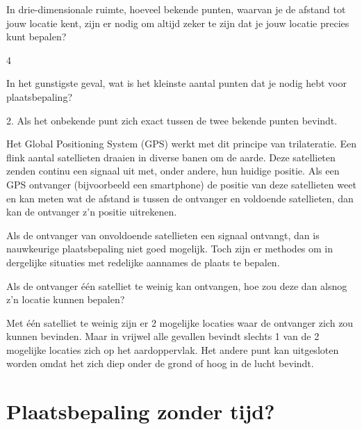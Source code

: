 \begin{opgave}
	\begin{subopgave}
		In drie-dimensionale ruimte, hoeveel bekende punten, waarvan je de afstand tot jouw locatie kent, zijn er nodig om altijd zeker te zijn dat je jouw locatie precies kunt bepalen? 
		\begin{antwoord}
			4
		\end{antwoord}
	\end{subopgave}
	\begin{subopgave}		
		In het gunstigste geval, wat is het kleinste aantal punten dat je nodig hebt voor plaatsbepaling?
		\begin{antwoord}
			2. Als het onbekende punt zich exact tussen de twee bekende punten bevindt.
		\end{antwoord}				
	\end{subopgave}
\end{opgave}

Het Global Positioning System (GPS) werkt met dit principe van trilateratie. Een flink aantal satellieten draaien in diverse banen om de aarde. Deze satellieten zenden continu een signaal uit met, onder andere, hun huidige positie. Als een GPS ontvanger (bijvoorbeeld een smartphone) de positie van deze satellieten weet en kan meten wat de afstand is tussen de ontvanger en voldoende satellieten, dan kan de ontvanger z'n positie uitrekenen.

Als de ontvanger van onvoldoende satellieten een signaal ontvangt, dan is nauwkeurige plaatsbepaling niet goed mogelijk. Toch zijn er methodes om in dergelijke situaties met redelijke aannames de plaats te bepalen.

\begin{opgave}
	Als de ontvanger \'e\'en satelliet te weinig kan ontvangen, hoe zou deze dan alsnog z'n locatie kunnen bepalen?
	\begin{antwoord}
		Met \'e\'en satelliet te weinig zijn er 2 mogelijke locaties waar de ontvanger zich zou kunnen bevinden. Maar in vrijwel alle gevallen bevindt slechts 1 van de 2 mogelijke locaties zich op het aardoppervlak. Het andere punt kan uitgesloten worden omdat het zich diep onder de grond of hoog in de lucht bevindt.
	\end{antwoord}
\end{opgave}

\section{Plaatsbepaling zonder tijd?}

